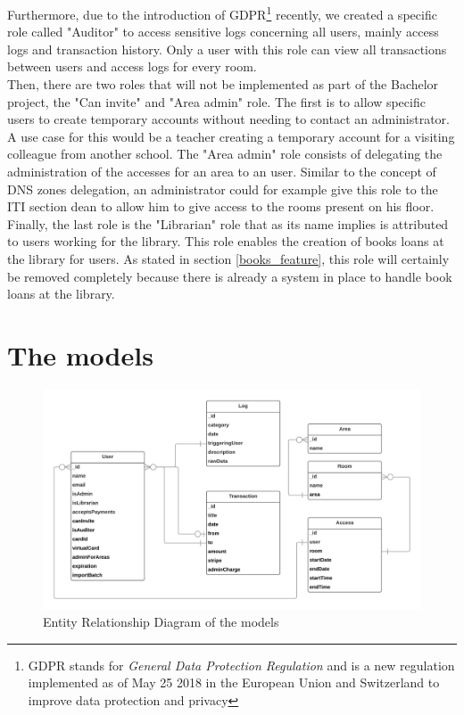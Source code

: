 \documentclass[twoside, openright,11pt,a4paper]{book}
\begin{document}
Furthermore, due to the introduction of GDPR\footnote{GDPR stands for \emph{General Data Protection Regulation} and is a new regulation implemented as of May 25 2018 in the European Union and Switzerland to improve data protection and privacy\cite{gdpr}} recently, we created a specific role called "Auditor" to access sensitive logs concerning all users, mainly access logs and transaction history. Only a user with this role can view all transactions between users and access logs for every room.\\

Then, there are two roles that will not be implemented as part of the Bachelor project, the "Can invite" and "Area admin" role. The first is to allow specific users to create temporary accounts without needing to contact an administrator. A use case for this would be a teacher creating a temporary account for a visiting colleague from another school. The "Area admin" role consists of delegating the administration of the accesses for an area to an user. Similar to the concept of DNS zones delegation, an administrator could for example give this role to the ITI section dean to allow him to give access to the rooms present on his floor.\\

Finally, the last role is the "Librarian" role that as its name implies is attributed to users working for the library. This role enables the creation of books loans at the library for users. As stated in section \ref{books_feature}, this role will certainly be removed completely because there is already a system in place to handle book loans at the library.

\section{The models}
\label{models}
\begin{figure}[H]
\begin{center}
	\includegraphics[width=\textwidth]{assets/models_relation}
	\caption{Entity Relationship Diagram of the models}
\end{center}
\end{figure}
\end{document}
